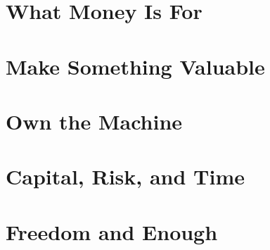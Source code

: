 \documentclass[11pt,twoside,openright]{book}
\begin{document}
\frontmatter
\hypersetup{pageanchor=false}

\hypersetup{pageanchor=true}
\tableofcontents

\mainmatter


\part{What Money Is For}





\part{Make Something Valuable}






\part{Own the Machine}







\part{Capital, Risk, and Time}






\part{Freedom and Enough}



\end{document}
